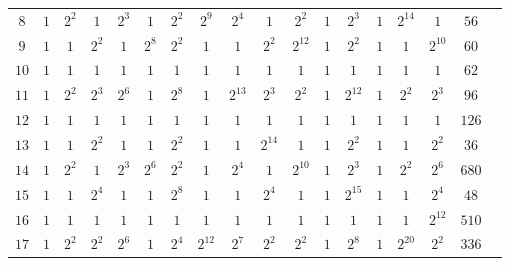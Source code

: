 \begin{table}
\begin{center}
\begin{adjustbox}{max width=\textwidth}
\begin{tabular}{|c|cccccccccccccccc|c|}
$8$ &$1$ &$2^2$ &$1$ &$2^3$ &$1$ &$2^2$ &$2^9$ &$2^4$ &$1$ &$2^2$ &$1$ &$2^3$ &$1$ &$2^{14}$ &$1$ &$56$ \\
$9$ &$1$ &$1$ &$2^2$ &$1$ &$2^8$ &$2^2$ &$1$ &$1$ &$2^2$ &$2^{12}$ &$1$ &$2^2$ &$1$ &$1$ &$2^{10}$ &$60$ \\
$10$ &$1$ &$1$ &$1$ &$1$ &$1$ &$1$ &$1$ &$1$ &$1$ &$1$ &$1$ &$1$ &$1$ &$1$ &$1$ &$62$ \\
$11$ &$1$ &$2^2$ &$2^3$ &$2^6$ &$1$ &$2^8$ &$1$ &$2^{13}$ &$2^3$ &$2^2$ &$1$ &$2^{12}$ &$1$ &$2^2$ &$2^3$ &$96$ \\
$12$ &$1$ &$1$ &$1$ &$1$ &$1$ &$1$ &$1$ &$1$ &$1$ &$1$ &$1$ &$1$ &$1$ &$1$ &$1$ &$126$ \\
$13$ &$1$ &$1$ &$2^2$ &$1$ &$1$ &$2^2$ &$1$ &$1$ &$2^{14}$ &$1$ &$1$ &$2^2$ &$1$ &$1$ &$2^2$ &$36$ \\
$14$ &$1$ &$2^2$ &$1$ &$2^3$ &$2^6$ &$2^2$ &$1$ &$2^4$ &$1$ &$2^{10}$ &$1$ &$2^3$ &$1$ &$2^2$ &$2^6$ &$680$ \\
$15$ &$1$ &$1$ &$2^4$ &$1$ &$1$ &$2^8$ &$1$ &$1$ &$2^4$ &$1$ &$1$ &$2^{15}$ &$1$ &$1$ &$2^4$ &$48$ \\
$16$ &$1$ &$1$ &$1$ &$1$ &$1$ &$1$ &$1$ &$1$ &$1$ &$1$ &$1$ &$1$ &$1$ &$1$ &$2^{12}$ &$510$ \\
$17$ &$1$ &$2^2$ &$2^2$ &$2^6$ &$1$ &$2^4$ &$2^{12}$ &$2^7$ &$2^2$ &$2^2$ &$1$ &$2^8$ &$1$ &$2^{20}$ &$2^2$ &$336$ \\

\end{tabular}
\end{adjustbox}
\end{center}
\end{table}
